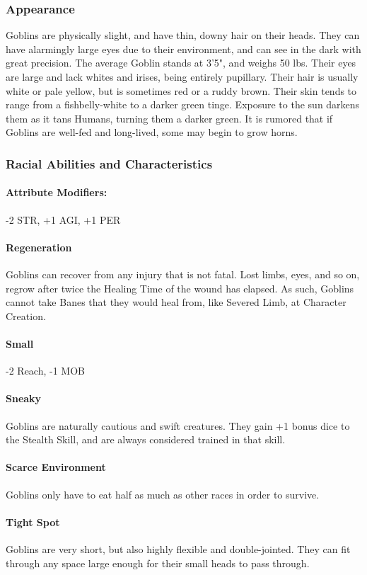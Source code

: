 \documentclass[oneside,11pt,english]{book}
\begin{document}
\subsubsection*{Appearance} 
Goblins are physically slight, and have thin, downy hair on their heads. They can have alarmingly large 
eyes due to their environment, and can see in the dark with great precision. The average Goblin stands at 
3'5", and weighs 50 lbs. Their eyes are large and lack whites and irises, being entirely pupillary. Their 
hair is usually white or pale yellow, but is sometimes red or a ruddy brown. Their skin tends to range 
from a fishbelly-white to a darker green tinge. Exposure to the sun darkens them as it tans Humans, 
turning them a darker green. It is rumored that if Goblins are well-fed and long-lived, some may begin to 
grow horns. 
\subsubsection*{Racial Abilities and Characteristics} 
\paragraph{Attribute Modifiers:} -2 STR, +1 AGI, +1 PER 
\paragraph{Regeneration}
Goblins can recover from any injury that is not fatal. Lost limbs, eyes, and so on, regrow after 
twice the Healing Time of the wound has elapsed. As such, Goblins cannot take Banes that they 
would heal from, like Severed Limb, at Character Creation. 
\paragraph{Small}
-2 Reach, -1 MOB 
\paragraph{Sneaky}
Goblins are naturally cautious and swift creatures. They gain +1 bonus dice to the Stealth Skill, 
and are always considered trained in that skill. 
\paragraph{Scarce Environment}
Goblins only have to eat half as much as other races in order to survive. 
\paragraph{Tight Spot}
Goblins are very short, but also highly flexible and double-jointed. They can fit through any 
space large enough for their small heads to pass through. 
\end{document}
